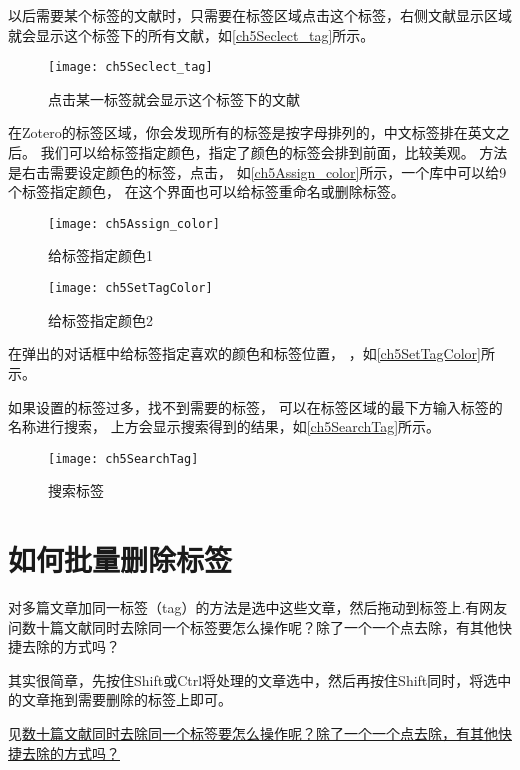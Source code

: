 \documentclass[theorem=false,mathfont=none,openany,sub3section]{easybook}
\begin{document}
{以后需要某个标签的文献时，只需要在标签区域点击这个标签，右侧文献显示区域就会显示这个标签下的所有文献，如\autoref{ch5Seclect_tag}所示。
\begin{figure}[htbp]
	\centering
	\texttt{[image: ch5Seclect\_tag]}
	\caption{点击某一标签就会显示这个标签下的文献}
	\label{ch5Seclect_tag}
\end{figure}

在Zotero的标签区域，你会发现所有的标签是按字母排列的，中文标签排在英文之后。
我们可以给标签指定颜色，指定了颜色的标签会排到前面，比较美观。
方法是右击需要设定颜色的标签，点击，
如\autoref{ch5Assign_color}所示，一个库中可以给9个标签指定颜色，
在这个界面也可以给标签重命名或删除标签。
\begin{figure}[htbp]
	\begin{minipage}[t]{\dimexpr0.5\textwidth-4em}
		\centering
		\texttt{[image: ch5Assign\_color]}
		\caption{给标签指定颜色1}
		\label{ch5Assign_color}
	\end{minipage}
	\begin{minipage}[t]{\dimexpr0.5\textwidth-4em}
		\centering
		\texttt{[image: ch5SetTagColor]}
		\caption{给标签指定颜色2}
		\label{ch5SetTagColor}
	\end{minipage}
\end{figure}	


在弹出的对话框中给标签指定喜欢的颜色和标签位置，
，如\autoref{ch5SetTagColor}所示。

如果设置的标签过多，找不到需要的标签，
可以在标签区域的最下方输入标签的名称进行搜索，
上方会显示搜索得到的结果，如\autoref{ch5SearchTag}所示。
\begin{figure}[htbp]
	\centering
	\texttt{[image: ch5SearchTag]}
	\caption{搜索标签}
	\label{ch5SearchTag}
\end{figure}

\section{如何批量删除标签}\label{sec:batch_delete_tag}
对多篇文章加同一标签（tag）的方法是选中这些文章，然后拖动到标签上.有网友问数十篇文献同时去除同一个标签要怎么操作呢？除了一个一个点去除，有其他快捷去除的方式吗？

其实很简章，先按住Shift或Ctrl将处理的文章选中，然后再按住Shift同时，将选中的文章拖到需要删除的标签上即可。

见\href{https://zhuanlan.zhihu.com/p/500361660}{数十篇文献同时去除同一个标签要怎么操作呢？除了一个一个点去除，有其他快捷去除的方式吗？}

}
\end{document}
